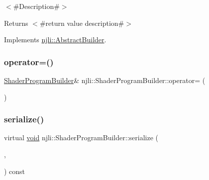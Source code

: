 $<$\#\+Description\#$>$

\begin{DoxyReturn}{Returns}
$<$\#return value description\#$>$ 
\end{DoxyReturn}


Implements \mbox{\hyperlink{classnjli_1_1_abstract_builder_a3e6e553e06d1ca30517ad5fb0bd4d000}{njli\+::\+Abstract\+Builder}}.

\mbox{\label{classnjli_1_1_shader_program_builder_a9a3271993de06e35de522429e79e616c}} 
\subsubsection{\texorpdfstring{operator=()}{operator=()}}
{\footnotesize\ttfamily \mbox{\hyperlink{classnjli_1_1_shader_program_builder}{Shader\+Program\+Builder}}\& njli\+::\+Shader\+Program\+Builder\+::operator= (\begin{DoxyParamCaption}\item[{const \mbox{\hyperlink{classnjli_1_1_shader_program_builder}{Shader\+Program\+Builder}} \&}]{ }\end{DoxyParamCaption})\hspace{0.3cm}{\ttfamily [protected]}}

\mbox{\label{classnjli_1_1_shader_program_builder_ae22417a6b93438971835bdf638fcebb8}} 
\subsubsection{\texorpdfstring{serialize()}{serialize()}}
{\footnotesize\ttfamily virtual \mbox{\hyperlink{_thread_8h_af1e856da2e658414cb2456cb6f7ebc66}{void}} njli\+::\+Shader\+Program\+Builder\+::serialize (\begin{DoxyParamCaption}\item[{\mbox{\hyperlink{_thread_8h_af1e856da2e658414cb2456cb6f7ebc66}{void}} $\ast$}]{,  }\item[{bt\+Serializer $\ast$}]{ }\end{DoxyParamCaption}) const\hspace{0.3cm}{\ttfamily [virtual]}}

